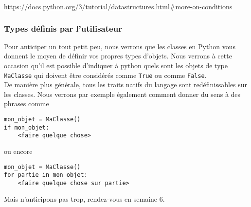     \href{https://docs.python.org/3/tutorial/datastructures.html\#more-on-conditions}{https://docs.python.org/3/tutorial/datastructures.html\#more-on-conditions}

    \hypertarget{types-duxe9finis-par-lutilisateur}{%
\subsubsection{Types définis par
l'utilisateur}\label{types-duxe9finis-par-lutilisateur}}

    Pour anticiper un tout petit peu, nous verrons que les classes en Python
vous donnent le moyen de définir vos propres types d'objets. Nous
verrons à cette occasion qu'il est possible d'indiquer à python quels
sont les objets de type \texttt{MaClasse} qui doivent être considérés
comme \texttt{True} ou comme \texttt{False}.\\

De manière plus générale, tous les traits natifs du langage sont
redéfinissables sur les classes. Nous verrons par exemple également
comment donner du sens à des phrases comme

\begin{verbatim}
mon_objet = MaClasse()
if mon_objet:
    <faire quelque chose>
\end{verbatim}

ou encore

\begin{verbatim}
mon_objet = MaClasse()
for partie in mon_objet:
    <faire quelque chose sur partie>
\end{verbatim}

Mais n'anticipons pas trop, rendez-vous en semaine 6.